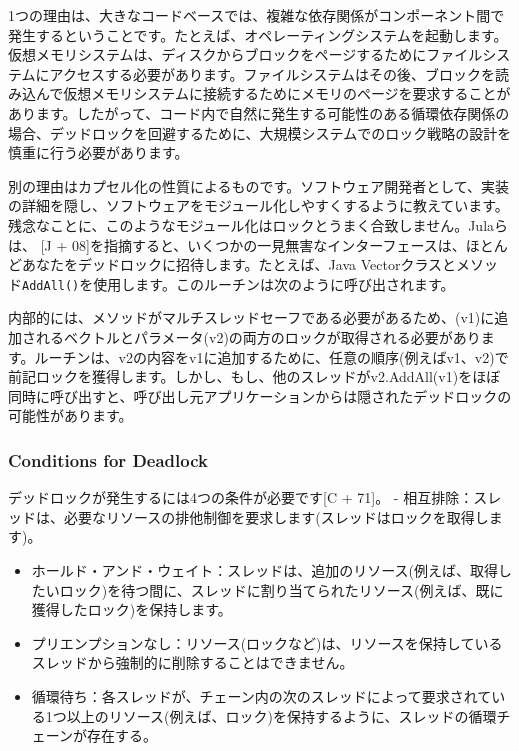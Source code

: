 1つの理由は、大きなコードベースでは、複雑な依存関係がコンポーネント間で発生するということです。たとえば、オペレーティングシステムを起動します。仮想メモリシステムは、ディスクからブロックをページするためにファイルシステムにアクセスする必要があります。ファイルシステムはその後、ブロックを読み込んで仮想メモリシステムに接続するためにメモリのページを要求することがあります。したがって、コード内で自然に発生する可能性のある循環依存関係の場合、デッドロックを回避するために、大規模システムでのロック戦略の設計を慎重に行う必要があります。

別の理由はカプセル化の性質によるものです。ソフトウェア開発者として、実装の詳細を隠し、ソフトウェアをモジュール化しやすくするように教えています。残念なことに、このようなモジュール化はロックとうまく合致しません。Julaらは、
{[}J +
08{]}を指摘すると、いくつかの一見無害なインターフェースは、ほとんどあなたをデッドロックに招待します。たとえば、Java
Vectorクラスとメソッド\texttt{AddAll()}を使用します。このルーチンは次のように呼び出されます。

\begin{Shaded}
\begin{Highlighting}[]
\end{Highlighting}
\end{Shaded}

内部的には、メソッドがマルチスレッドセーフである必要があるため、(v1)に追加されるベクトルとパラメータ(v2)の両方のロックが取得される必要があります。ルーチンは、v2の内容をv1に追加するために、任意の順序(例えばv1、v2)で前記ロックを獲得します。しかし、もし、他のスレッドがv2.AddAll(v1)をほぼ同時に呼び出すと、呼び出し元アプリケーションからは隠されたデッドロックの可能性があります。

\hypertarget{conditions-for-deadlock}{%
\subsubsection*{Conditions for Deadlock}\label{conditions-for-deadlock}}

デッドロックが発生するには4つの条件が必要です{[}C + 71{]}。 -
相互排除：スレッドは、必要なリソースの排他制御を要求します(スレッドはロックを取得します)。

\begin{itemize}
\item
  ホールド・アンド・ウェイト：スレッドは、追加のリソース(例えば、取得したいロック)を待つ間に、スレッドに割り当てられたリソース(例えば、既に獲得したロック)を保持します。
\item
  プリエンプションなし：リソース(ロックなど)は、リソースを保持しているスレッドから強制的に削除することはできません。
\item
  循環待ち：各スレッドが、チェーン内の次のスレッドによって要求されている1つ以上のリソース(例えば、ロック)を保持するように、スレッドの循環チェーンが存在する。
\end{itemize}


